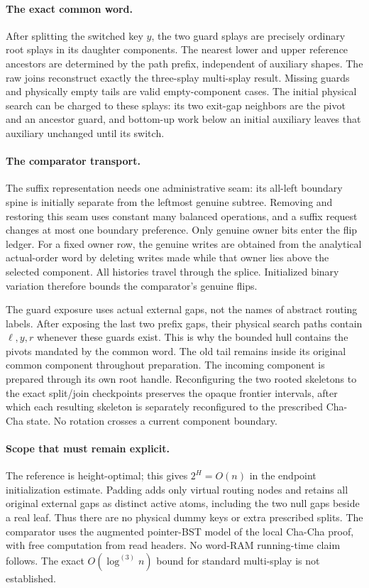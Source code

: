 \documentclass[11pt]{article}
\begin{document}
\paragraph{The exact common word.}
After splitting the switched key $y$, the two guard splays are precisely
ordinary root splays in its daughter components. The nearest lower and
upper reference ancestors are determined by the path prefix, independent
of auxiliary shapes. The raw joins reconstruct exactly the three-splay
multi-splay result. Missing guards and physically empty tails are valid
empty-component cases. The initial physical search can be charged to
these splays: its two exit-gap neighbors are the pivot and an ancestor
guard, and bottom-up work below an initial auxiliary leaves that
auxiliary unchanged until its switch.

\paragraph{The comparator transport.}
The suffix representation needs one administrative seam: its all-left
boundary spine is initially separate from the leftmost genuine
subtree. Removing and restoring this seam uses constant many balanced
operations, and a suffix request changes at most one boundary preference.
Only genuine owner bits enter the flip ledger. For a fixed owner row,
the genuine writes are obtained from the analytical actual-order word
by deleting writes made while that owner lies above the selected
component. All histories travel through the splice. Initialized binary
variation therefore bounds the comparator's genuine flips.

The guard exposure uses actual external gaps, not the names of abstract
routing labels. After exposing the last two prefix gaps, their physical
search paths contain $\ell,y,r$ whenever these guards exist. This is
why the bounded hull contains the pivots mandated by the common word.
The old tail remains inside its original common component throughout
preparation. The incoming component is prepared through its own root
handle. Reconfiguring the two rooted skeletons to the exact split/join
checkpoints preserves the opaque frontier intervals, after which each
resulting skeleton is separately reconfigured to the prescribed
Cha-Cha state. No rotation crosses a current component boundary.

\paragraph{Scope that must remain explicit.}
The reference is height-optimal; this gives $2^H=O(n)$ in the endpoint
initialization estimate. Padding adds only virtual routing nodes and
retains all original external gaps as distinct active atoms, including
the two null gaps beside a real leaf. Thus there are no physical dummy
keys or extra prescribed splits. The comparator uses the augmented
pointer-BST model of the local Cha-Cha proof, with free computation
from read headers. No word-RAM running-time claim follows. The exact
$O(\log^{(3)}n)$ bound for standard multi-splay is not established.
\end{document}

